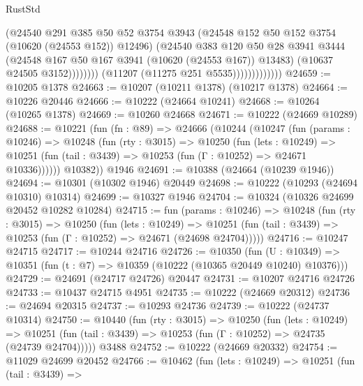 \begin{lexlean}{RustStd}
\begin{coremodule}
                                    (@24540
                                      @291
                                      @385
                                      @50
                                      @52
                                      @3754
                                      @3943
                                      (@24548 @152 @50 @152 @3754 (@10620 (@24553 @152)) @12496)
                                      (@24540
                                        @383
                                        @120
                                        @50
                                        @28
                                        @3941
                                        @3444
                                        (@24548 @167 @50 @167 @3941 (@10620 (@24553 @167)) @13483)
                                        (@10637 @24505 @3152))))))))
                          (@11207 (@11275 @251 @5535)))))))))))))
@24659 := @10205 @1378
@24663 := @10207 (@10211 @1378) (@10217 @1378)
@24664 := @10226 @20446
@24666 := @10222 (@24664 @10241)
@24668 := @10264 (@10265 @1378)
@24669 := @10260 @24668
@24671 := @10222 (@24669 @10289)
@24688 := @10221
    (fun (fn : @89) =>
    @24666
      (@10244
        (@10247
          (fun (params : @10246) =>
          @10248
            (fun (rty : @3015) =>
            @10250
              (fun (lets : @10249) =>
              @10251 (fun (tail : @3439) => @10253 (fun (Γ : @10252) => @24671 @10336))))))
        @10382))
    @1946
@24691 := @10388 (@24664 (@10239 @1946))
@24694 := @10301 (@10302 @1946) @20449
@24698 := @10222 (@10293 (@24694 @10310) @10314)
@24699 := @10327 @1946
@24704 := @10324 (@10326 @24699 @20452 @10282 @10284)
@24715 := fun (params : @10246) =>
  @10248
    (fun (rty : @3015) =>
    @10250
      (fun (lets : @10249) =>
      @10251 (fun (tail : @3439) => @10253 (fun (Γ : @10252) => @24671 (@24698 @24704)))))
@24716 := @10247 @24715
@24717 := @10244 @24716
@24726 := @10350
    (fun (U : @10349) => @10351 (fun (t : @7) => @10359 (@10222 (@10365 @20449 @10240) @10376)))
@24729 := @24691 (@24717 @24726) @20447
@24731 := @10207 @24716 @24726
@24733 := @10437 @24715 @4951
@24735 := @10222 (@24669 @20312)
@24736 := @24694 @20315
@24737 := @10293 @24736
@24739 := @10222 (@24737 @10314)
@24750 := @10440
    (fun (rty : @3015) =>
    @10250
      (fun (lets : @10249) =>
      @10251 (fun (tail : @3439) => @10253 (fun (Γ : @10252) => @24735 (@24739 @24704)))))
    @3488
@24752 := @10222 (@24669 @20332)
@24754 := @11029 @24699 @20452
@24766 := @10462
    (fun (lets : @10249) =>
    @10251
      (fun (tail : @3439) =>

\end{coremodule}
\end{lexlean}
